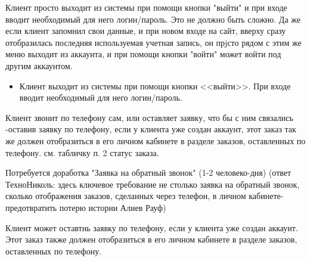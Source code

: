 {


\begin{wiki}
Клиент просто выходит из системы при помощи кнопки "выйти" и при входе вводит необходимый для него логин/пароль. Это не должно быть сложно. Да же если клиент запомнил свои данные, и при новом входе на сайт, вверху сразу отобразилась последняя используемая учетная запись, он прjсто рядом с этим же меню выходит из аккаунта, и при помощи кнопки "войти" может войти под другим аккаунтом. 
\end{wiki}


\begin{itemize}
\item Клиент выходит из системы при помощи кнопки <<выйти>>. При входе вводит необходимый для него логин/пароль.  
\end{itemize}



}



{

\begin{wiki}
Клиент звонит по телефону сам, или оставляет заявку, что бы с ним связались -оставив заявку по телефону, если у клиента уже создан аккаунт, этот заказ так же должен отобразиться в его личном кабинете в разделе заказов, оставленных по телефону. см. табличку п. 2 статус заказа.
\end{wiki}

\begin{teamidea}
Потребуется доработка "Заявка на обратный звонок" (1-2 человеко-дня)
(ответ ТехноНиколь: здесь ключевое требование не столько заявка на обратный звонок, сколько отображения заказов, сделанных через телефон, в личном кабинете-предотвратить потерю истории Алиев Рауф)
\end{teamidea}


\begin{itogo}
Клиент может оставтиь заявку по телефону, если у клиента уже создан аккаунт. Этот заказ также должен отобразиться в его личном кабинете в разделе заказов, оставленных по телефону.
\end{itogo}



}

